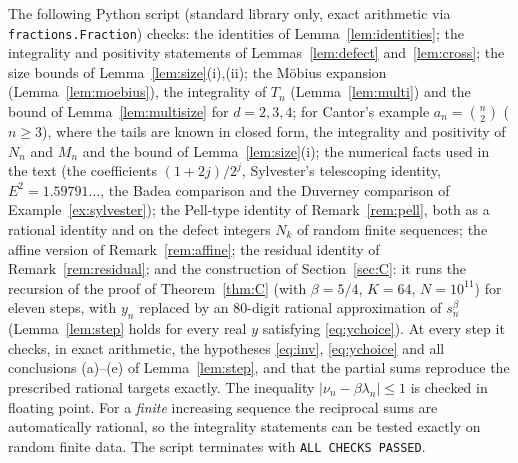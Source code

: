\documentclass[11pt]{amsart}
\theoremstyle{definition}
\theoremstyle{remark}
\begin{document}
The following Python script (standard library only, exact arithmetic via
\texttt{fractions.Fraction}) checks: the identities of Lemma~\ref{lem:identities}; the
integrality and positivity statements of Lemmas~\ref{lem:defect} and~\ref{lem:cross};
the size bounds of Lemma~\ref{lem:size}(i),(ii); the M\"obius expansion
(Lemma~\ref{lem:moebius}), the integrality of $T_n$ (Lemma~\ref{lem:multi}) and the
bound of Lemma~\ref{lem:multisize} for $d=2,3,4$; for Cantor's example
$a_n=\binom n2$ ($n\ge3$), where the tails are known in closed form, the integrality and
positivity of $N_n$ and $M_n$ and the bound of Lemma~\ref{lem:size}(i); the numerical
facts used in the text (the coefficients $(1+2j)/2^j$, Sylvester's telescoping identity,
$E^2=1.59791\ldots$, the Badea comparison and the Duverney comparison of
Example~\ref{ex:sylvester}); the Pell-type identity of Remark~\ref{rem:pell}, both as a
rational identity and on the defect integers $N_k$ of random finite sequences; the
affine version of Remark~\ref{rem:affine}; the residual identity of
Remark~\ref{rem:residual}; and the construction of Section~\ref{sec:C}: it runs the
recursion of the proof of Theorem~\ref{thm:C} (with $\beta=5/4$, $K=64$, $N=10^{11}$)
for eleven steps, with $y_n$ replaced by an $80$-digit rational approximation of
$s_n^\beta$ (Lemma~\ref{lem:step} holds for every real $y$ satisfying \eqref{eq:ychoice}).
At every step it checks, in exact arithmetic, the hypotheses \eqref{eq:inv},
\eqref{eq:ychoice} and all conclusions (a)--(e) of Lemma~\ref{lem:step}, and that the
partial sums reproduce the prescribed rational targets exactly. The inequality
$|\nu_n-\beta\lambda_n|\le1$ is checked in floating point. For a \emph{finite}
increasing sequence the reciprocal sums are automatically rational, so the integrality
statements can be tested exactly on random finite data. The script terminates with
\texttt{ALL CHECKS PASSED}.
\end{document}
